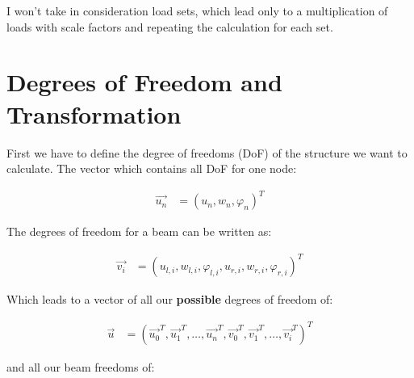I won't take in consideration load sets, which lead only to a multiplication of loads with scale factors and repeating the calculation for each set.

\section{Degrees of Freedom and Transformation}

First we have to define the degree of freedoms (DoF) of the structure we want to calculate. The vector which contains all DoF for one node:

\begin{align}
\vec{u_n} &= \left(u_n, w_n, \varphi_n\right)^T
\end{align}

The degrees of freedom for a beam can be written as:

\begin{align}
\vec{v_i} &= \left(u_{l, i} , w_{l, i} , \varphi_{l, i} , u_{r, i} , w_{r, i} , \varphi_{r, i}\right)^T
\end{align}


Which leads to a vector of all our \textbf{possible} degrees of freedom of:

\begin{align}
\vec{u} &= \left(\vec{u_0}^T, \vec{u_1}^T, \dots, \vec{u_n}^T, \vec{v_0}^T, \vec{v_1}^T, \dots, \vec{v_i}^T\right)^T
\end{align}

and all our beam freedoms of:


